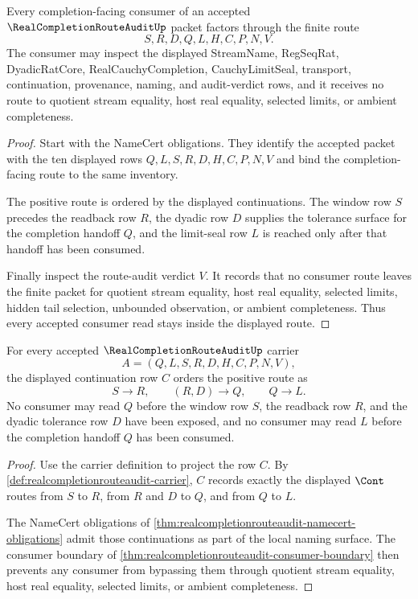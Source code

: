 \begin{theorem}
\label{thm:realcompletionrouteaudit-consumer-boundary}
Every completion-facing consumer of an accepted $\RealCompletionRouteAuditUp$ packet factors through the finite route
$$
S,R,D,Q,L,H,C,P,N,V.
$$
The consumer may inspect the displayed StreamName, RegSeqRat, DyadicRatCore, RealCauchyCompletion, CauchyLimitSeal, transport, continuation, provenance, naming, and audit-verdict rows, and it receives no route to quotient stream equality, host real equality, selected limits, or ambient completeness.
\end{theorem}
\begin{proof}
Start with the NameCert obligations. They identify the accepted packet with the ten displayed rows $Q,L,S,R,D,H,C,P,N,V$ and bind the completion-facing route to the same inventory.

The positive route is ordered by the displayed continuations. The window row $S$ precedes the readback row $R$, the dyadic row $D$ supplies the tolerance surface for the completion handoff $Q$, and the limit-seal row $L$ is reached only after that handoff has been consumed.

Finally inspect the route-audit verdict $V$. It records that no consumer route leaves the finite packet for quotient stream equality, host real equality, selected limits, hidden tail selection, unbounded observation, or ambient completeness. Thus every accepted consumer read stays inside the displayed route.
\end{proof}

\begin{theorem}
\label{thm:realcompletionrouteaudit-route-ordering}
For every accepted $\RealCompletionRouteAuditUp$ carrier
$$
A=(Q,L,S,R,D,H,C,P,N,V),
$$
the displayed continuation row $C$ orders the positive route as
$$
S \to R,\qquad (R,D)\to Q,\qquad Q\to L.
$$
No consumer may read $Q$ before the window row $S$, the readback row $R$, and the dyadic tolerance row $D$ have been exposed, and no consumer may read $L$ before the completion handoff $Q$ has been consumed.
\end{theorem}
\begin{proof}
Use the carrier definition to project the row $C$. By \autoref{def:realcompletionrouteaudit-carrier}, $C$ records exactly the displayed $\Cont$ routes from $S$ to $R$, from $R$ and $D$ to $Q$, and from $Q$ to $L$.

The NameCert obligations of \autoref{thm:realcompletionrouteaudit-namecert-obligations} admit those continuations as part of the local naming surface. The consumer boundary of \autoref{thm:realcompletionrouteaudit-consumer-boundary} then prevents any consumer from bypassing them through quotient stream equality, host real equality, selected limits, or ambient completeness.
\end{proof}


